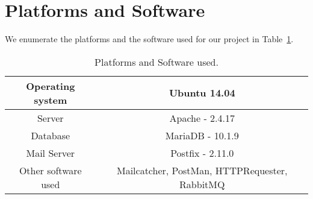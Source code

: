 \section[Platform]{Platforms and Software}

We enumerate the platforms and the software used for our project in Table~\ref{tab:platsw}.
\begin{table}[!htbp]
	\centering
	\begin{tabular}{|c|c|}
		\hline
		Operating system & Ubuntu 14.04\\
		\hline
		Server & Apache - 2.4.17\\
		\hline
		Database & MariaDB - 10.1.9\\
		\hline
		Mail Server & Postfix - 2.11.0\\
		\hline
		Other software used & Mailcatcher, PostMan, HTTPRequester, RabbitMQ\\
		\hline
	\end{tabular}
	\caption{Platforms and Software used.}
	\label{tab:platsw}
\end{table}